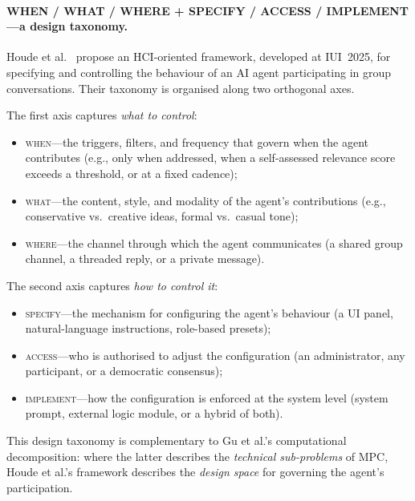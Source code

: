 \paragraph{WHEN / WHAT / WHERE + SPECIFY / ACCESS / IMPLEMENT---a design taxonomy.}
Houde et al.~\cite{houde2025koala} propose an HCI-oriented framework,
developed at IUI~2025, for specifying and controlling the behaviour of an AI
agent participating in group conversations.  Their taxonomy is organised along
two orthogonal axes.

The first axis captures \emph{what to control}:
\begin{itemize}[nosep]
  \item \textsc{when}---the triggers, filters, and frequency that govern when
    the agent contributes (e.g., only when addressed, when a self-assessed
    relevance score exceeds a threshold, or at a fixed cadence);
  \item \textsc{what}---the content, style, and modality of the agent's
    contributions (e.g., conservative vs.\ creative ideas, formal vs.\ casual
    tone);
  \item \textsc{where}---the channel through which the agent communicates (a
    shared group channel, a threaded reply, or a private message).
\end{itemize}

The second axis captures \emph{how to control it}:
\begin{itemize}[nosep]
  \item \textsc{specify}---the mechanism for configuring the agent's behaviour
    (a UI panel, natural-language instructions, role-based presets);
  \item \textsc{access}---who is authorised to adjust the configuration (an
    administrator, any participant, or a democratic consensus);
  \item \textsc{implement}---how the configuration is enforced at the system
    level (system prompt, external logic module, or a hybrid of both).
\end{itemize}

This design taxonomy is complementary to Gu et al.'s computational
decomposition: where the latter describes the \emph{technical sub-problems} of
MPC, Houde et al.'s framework describes the \emph{design space} for governing
the agent's participation.

